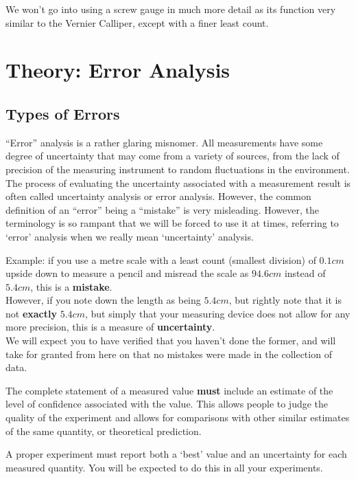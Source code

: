 We won't go into using a screw gauge in much more detail as its function very similar to the Vernier Calliper, except with a finer least count.

\section{Theory: Error Analysis}

\subsection{Types of Errors}

``Error'' analysis is a rather glaring misnomer. All measurements have some degree of uncertainty that may come from a variety of sources, from the lack of precision of the measuring instrument to random fluctuations in the environment. The process of evaluating the uncertainty associated with a measurement result is often called uncertainty analysis or error analysis. However, the common definition of an ``error'' being a ``mistake'' is very misleading. However, the terminology is so rampant that we will be forced to use it at times, referring to `error' analysis when we really mean `uncertainty' analysis.


\begin{tip}
Example: if you use a metre scale with a least count (smallest division) of $0.1cm$ upside down to measure a pencil and misread the scale as $94.6cm$ instead of $5.4cm$, this is a \textbf{mistake}.\\

However, if you note down the length as being $5.4cm$, but rightly note that it is not \textbf{exactly} $5.4cm$, but simply that your measuring device does not allow for any more precision, this is a measure of \textbf{uncertainty}. \\

We will expect you to have verified that you haven't done the former, and will take for granted from here on that no mistakes were made in the collection of data.
\end{tip}


The complete statement of a measured value \textbf{must} include an estimate of the level of confidence associated with the value. This allows people to judge the quality of the experiment and allows for comparisons with other similar estimates of the same quantity, or theoretical prediction.  

\begin{imp}
A proper experiment must report both a `best' value and an uncertainty for each measured quantity. You will be expected to do this in all your experiments. 
\end{imp}

